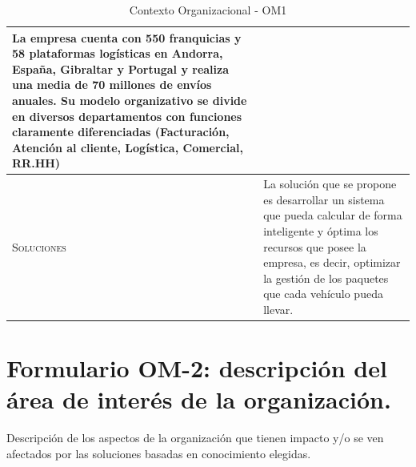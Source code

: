 \begin{table}[H]
{\begin{tabularx}{\textwidth}{|l|X|}
      La empresa cuenta con 550 franquicias y 58 plataformas logísticas en Andorra, España, Gibraltar y Portugal y realiza una media de 70 millones de envíos anuales. Su modelo organizativo se divide en diversos departamentos con funciones claramente diferenciadas (Facturación, Atención al cliente, Logística, Comercial, RR.HH) \\ 
      \hline
      \textsc{Soluciones} & La solución que se propone es desarrollar un sistema que pueda calcular de forma inteligente y óptima los recursos que posee la empresa, es decir, optimizar la gestión de los paquetes que cada vehículo pueda llevar. \\
      \hline
    \end{tabularx}
  }
  \caption{\label{tab:OM1}Contexto Organizacional - OM1}
\end{table}
	
 
\section{Formulario OM-2: descripción del área de interés de la organización.}

Descripción de los aspectos de la organización que tienen impacto y/o se ven afectados
  por las soluciones basadas en conocimiento elegidas.


